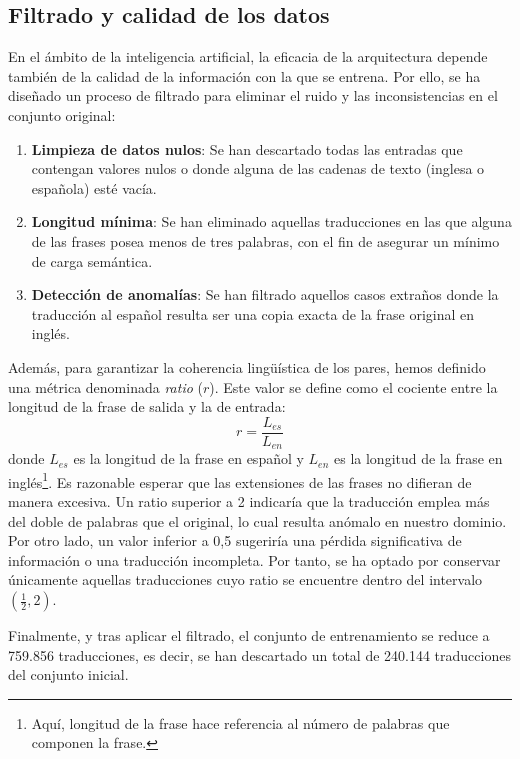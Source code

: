 \subsection{Filtrado y calidad de los datos}

En el ámbito de la inteligencia artificial, la eficacia de la arquitectura depende también de la calidad de la información con la que se entrena. 
Por ello, se ha diseñado un proceso de filtrado  para eliminar el ruido y las inconsistencias  en el conjunto original:

\begin{enumerate}
    \item \textbf{Limpieza de datos nulos}: Se han descartado todas las entradas que contengan valores nulos o donde alguna de las cadenas de 
    texto (inglesa o española) esté vacía.
    \item \textbf{Longitud mínima}: Se han eliminado aquellas traducciones en las que alguna de las frases posea menos de tres palabras, 
    con el fin de asegurar un mínimo de carga semántica.
    \item \textbf{Detección de anomalías}: Se han filtrado aquellos casos extraños donde la traducción al español resulta ser una 
    copia exacta de la frase original en inglés.
\end{enumerate}


Además, para garantizar la coherencia lingüística de los pares, hemos definido una métrica denominada \textit{ratio} ($r$). 
Este valor se define como el cociente entre la longitud de la frase de salida y la de entrada:
\begin{equation}
    r = \frac{L_{es}}{L_{en}}
\end{equation}
donde $L_{es}$ es la longitud de la frase en español y $L_{en}$ es la longitud de la frase en inglés\footnote{Aquí, longitud de la frase 
hace referencia al número de palabras que componen la frase.}.
Es razonable esperar que las extensiones de las frases no difieran de manera excesiva. Un ratio superior a 2 indicaría que la 
traducción emplea más del doble de palabras que el original, lo cual resulta anómalo en nuestro dominio. Por otro lado, un valor inferior 
a 0,5 sugeriría una pérdida significativa de información o una traducción incompleta. 
Por tanto, se ha optado por conservar únicamente aquellas traducciones cuyo ratio se encuentre dentro del intervalo $(\frac{1}{2}, 2)$.

Finalmente, y tras aplicar el filtrado, el conjunto de entrenamiento se reduce a 759.856 traducciones, es decir, se han
 descartado un total de  240.144 traducciones del conjunto inicial.

